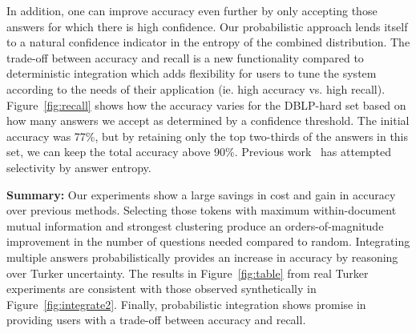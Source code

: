 In addition, one can improve accuracy even further by only accepting those answers for which there is high confidence.  Our probabilistic approach lends itself to a natural confidence indicator in the entropy of the combined distribution.  The trade-off between accuracy and recall is a new functionality compared to deterministic integration which adds flexibility for users to tune the system according to the needs of their application (ie. high accuracy vs. high recall).  Figure~\ref{fig:recall} shows how the accuracy varies for the DBLP-hard set based on how many answers we accept as determined by a confidence threshold.  The initial accuracy was 77\%, but by retaining only the top two-thirds of the answers in this set, we can keep the total accuracy above 90\%.  Previous work~\cite{Sheng:2008:GLI:1401890.1401965} has attempted selectivity by answer entropy.%


\noindent\textbf{Summary:} Our experiments show a large savings in cost and gain in accuracy over previous methods.  Selecting those tokens with maximum within-document mutual information and strongest clustering produce an orders-of-magnitude improvement in the number of questions needed compared to random.  Integrating multiple answers probabilistically provides an increase in accuracy by reasoning over Turker uncertainty.  The results in Figure~\ref{fig:table} from real Turker experiments are consistent with those observed synthetically in Figure~\ref{fig:integrate2}.  Finally, probabilistic integration shows promise in providing users with a trade-off between accuracy and recall.
